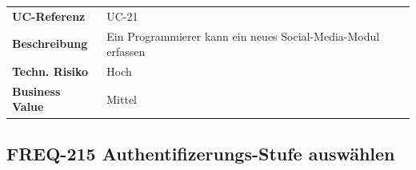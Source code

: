 \begin{longtable}[c]{@{}ll@{}}
\toprule
\begin{minipage}[t]{0.20\columnwidth}\raggedright\strut
\textbf{UC-Referenz}
\strut\end{minipage} &
\begin{minipage}[t]{0.74\columnwidth}\raggedright\strut
UC-21
\strut\end{minipage}\tabularnewline
\begin{minipage}[t]{0.20\columnwidth}\raggedright\strut
\textbf{Beschreibung}
\strut\end{minipage} &
\begin{minipage}[t]{0.74\columnwidth}\raggedright\strut
Ein Programmierer kann ein neues Social-Media-Modul erfassen
\strut\end{minipage}\tabularnewline
\begin{minipage}[t]{0.20\columnwidth}\raggedright\strut
\textbf{Techn. Risiko}
\strut\end{minipage} &
\begin{minipage}[t]{0.74\columnwidth}\raggedright\strut
Hoch
\strut\end{minipage}\tabularnewline
\begin{minipage}[t]{0.20\columnwidth}\raggedright\strut
\textbf{Business Value}
\strut\end{minipage} &
\begin{minipage}[t]{0.74\columnwidth}\raggedright\strut
Mittel
\strut\end{minipage}\tabularnewline
\bottomrule
\end{longtable}

\subsection{FREQ-215 Authentifizerungs-Stufe
auswählen}\label{freq-215-authentifizerungs-stufe-auswuxe4hlen}

